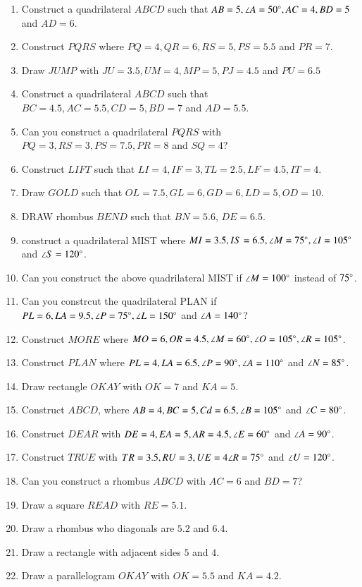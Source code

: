 \renewcommand{\theequation}{\theenumi}
\begin{enumerate}[label=\arabic*.,ref=\thesubsection.\theenumi]


\item Construct a quadrilateral $ABCD$ such that $AB=5, \angle A = 50\degree, AC = 4, BD = 5$ and $AD = 6$.
\item Construct $PQRS$ where $PQ = 4, QR = 6, RS = 5, PS = 5.5$ and $PR = 7$.
\item Draw $JUMP$ with $JU = 3.5, UM=4, MP = 5, PJ =4.5$ and $PU = 6.5$
\item Construct a quadrilateral $ABCD$ such that $BC=4.5,  AC = 5.5, CD = 5, BD = 7$ and $AD = 5.5$.
\item Can you construct a quadrilateral $PQRS$ with $PQ=3, RS=3, PS=7.5, PR=8$ and $SQ=4$?
\item Construct $LIFT$ such that $LI = 4, IF = 3, TL = 2.5, LF = 4.5, IT=4$.
\item Draw $GOLD$ such that $OL=7.5, GL=6, GD=6, LD = 5, OD = 10$.
\item DRAW rhombus $BEND$ such that $BN = 5.6$, $DE = 6.5$.
\item construct a quadrilateral MIST where $MI = 3.5, IS = 6.5, \angle M = 75 \degree, \angle I = 105 \degree$ and $\angle S = 120 \degree$.
\item Can you construct the above quadrilateral MIST if $\angle M = 100 \degree$ instead of $75 \degree$.
\item Can you constrcut the quadrilateral PLAN if $PL = 6, LA = 9.5, \angle P = 75 \degree, \angle L = 150 \degree$ and $\angle A = 140 \degree$?
\item Construct $MORE$ where $MO = 6, OR = 4.5, \angle M = 60 \degree, \angle O = 105 \degree, \angle R = 105 \degree$.
\item Construct $PLAN$ where $PL = 4, LA = 6.5, \angle P = 90 \degree, \angle A = 110\degree$ and $\angle N = 85\degree$.
\item Draw  rectangle $OKAY$ with $OK = 7$ and $KA = 5$.
\item Construct $ABCD $, where $AB = 4, BC = 5, Cd = 6.5, \angle B = 105 \degree$ and $\angle C = 80\degree$.
\item Construct $DEAR$ with $DE = 4, EA = 5, AR = 4.5, \angle E = 60 \degree$ and $\angle A = 90 \degree$.\item Construct $TRUE$ with $TR = 3.5, RU = 3, UE = 4 \angle R = 75\degree$ and $\angle U = 120\degree$.

\item Can you construct a rhombus $ABCD$ with $AC = 6$ and $BD = 7$?
\item Draw a square $READ$ with $RE = 5.1$.
\item Draw a rhombus who diagonals are $5.2$ and $6.4$.
\item Draw a rectangle with adjacent sides $5$ and $4$.
\item Draw a parallelogram $OKAY$ with $OK = 5.5$ and $KA = 4.2$.


\end{enumerate}
%
